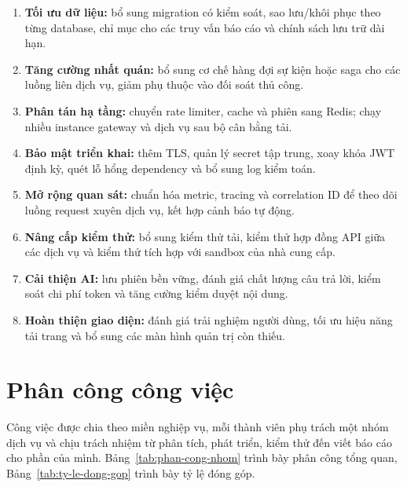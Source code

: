 \begin{enumerate}
  \item \textbf{Tối ưu dữ liệu:} bổ sung migration có kiểm soát, sao lưu/khôi phục theo từng database, chỉ mục cho các truy vấn báo cáo và chính sách lưu trữ dài hạn.
  \item \textbf{Tăng cường nhất quán:} bổ sung cơ chế hàng đợi sự kiện hoặc saga cho các luồng liên dịch vụ, giảm phụ thuộc vào đối soát thủ công.
  \item \textbf{Phân tán hạ tầng:} chuyển rate limiter, cache và phiên sang Redis; chạy nhiều instance gateway và dịch vụ sau bộ cân bằng tải.
  \item \textbf{Bảo mật triển khai:} thêm TLS, quản lý secret tập trung, xoay khóa JWT định kỳ, quét lỗ hổng dependency và bổ sung log kiểm toán.
  \item \textbf{Mở rộng quan sát:} chuẩn hóa metric, tracing và correlation ID để theo dõi luồng request xuyên dịch vụ, kết hợp cảnh báo tự động.
  \item \textbf{Nâng cấp kiểm thử:} bổ sung kiểm thử tải, kiểm thử hợp đồng API giữa các dịch vụ và kiểm thử tích hợp với sandbox của nhà cung cấp.
  \item \textbf{Cải thiện AI:} lưu phiên bền vững, đánh giá chất lượng câu trả lời, kiểm soát chi phí token và tăng cường kiểm duyệt nội dung.
  \item \textbf{Hoàn thiện giao diện:} đánh giá trải nghiệm người dùng, tối ưu hiệu năng tải trang và bổ sung các màn hình quản trị còn thiếu.
\end{enumerate}

\section{Phân công công việc}
\label{sec:phan-cong}

Công việc được chia theo miền nghiệp vụ, mỗi thành viên phụ trách một nhóm dịch vụ và chịu trách nhiệm từ phân tích, phát triển, kiểm thử đến viết báo cáo cho phần của mình. Bảng~\ref{tab:phan-cong-nhom} trình bày phân công tổng quan, Bảng~\ref{tab:ty-le-dong-gop} trình bày tỷ lệ đóng góp.

